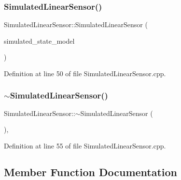 \subsubsection{\texorpdfstring{Simulated\+Linear\+Sensor()}{SimulatedLinearSensor()}\hspace{0.1cm}{\footnotesize\ttfamily [3/3]}}
{\footnotesize\ttfamily Simulated\+Linear\+Sensor\+::\+Simulated\+Linear\+Sensor (\begin{DoxyParamCaption}\item[{std\+::unique\+\_\+ptr$<$ \mbox{\hyperlink{classbfl_1_1SimulatedStateModel}{bfl\+::\+Simulated\+State\+Model}} $>$}]{simulated\+\_\+state\+\_\+model }\end{DoxyParamCaption})}



Definition at line 50 of file Simulated\+Linear\+Sensor.\+cpp.

\mbox{\label{classbfl_1_1SimulatedLinearSensor_a3bb14237890741300a25aa63e12f9855}} 
\subsubsection{\texorpdfstring{$\sim$\+Simulated\+Linear\+Sensor()}{~SimulatedLinearSensor()}}
{\footnotesize\ttfamily Simulated\+Linear\+Sensor\+::$\sim$\+Simulated\+Linear\+Sensor (\begin{DoxyParamCaption}{ }\end{DoxyParamCaption})\hspace{0.3cm}{\ttfamily [virtual]}, {\ttfamily [noexcept]}}



Definition at line 55 of file Simulated\+Linear\+Sensor.\+cpp.



\subsection{Member Function Documentation}
\mbox{\label{classbfl_1_1Logger_a440467a28ccc46490d767fe0ef6f556a}} 
